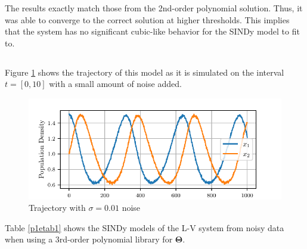 \documentclass[11pt]{article}
\begin{document}
The results exactly match those from the 2nd-order polynomial solution. Thus, it was able to converge to the correct solution at higher thresholds. This implies that the system has no significant cubic-like behavior for the SINDy model to fit to.


\subsection{} %

Figure \ref{p1efig1} shows the trajectory of this model as it is simulated on the interval $t=[0, 10]$ with a small amount of noise added.

\begin{figure}[H]
    \centering
    \includegraphics[width=5in]{p1fig2.pdf}
    \caption{Trajectory with $\sigma=0.01$ noise}
    \label{p1efig1}
\end{figure}

Table \ref{p1etab1} shows the SINDy models of the L-V system from noisy data when using a 3rd-order polynomial library for $\mathbf{\Theta}$.
\end{document}
